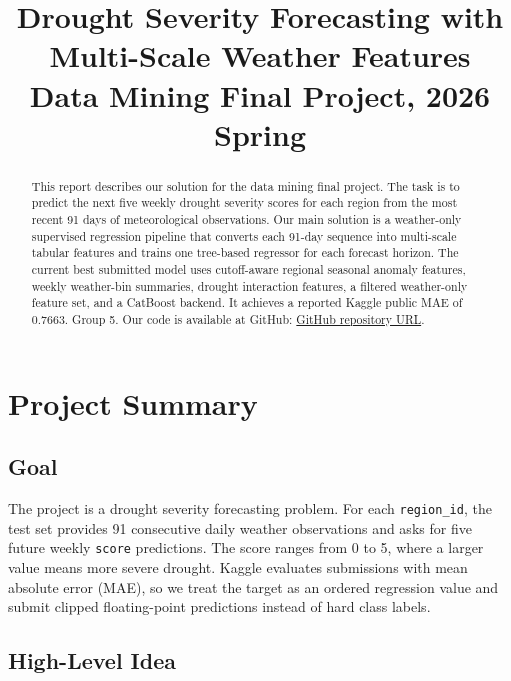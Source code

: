 \documentclass[conference]{IEEEtran}
\begin{document}
\title{Drought Severity Forecasting with Multi-Scale Weather Features\\
{\footnotesize Data Mining Final Project, 2026 Spring}
}

\author{
\and
{}
\and
{}
}

\maketitle

\begin{abstract}
This report describes our solution for the data mining final project. The task is
to predict the next five weekly drought severity scores for each region from the
most recent 91 days of meteorological observations. Our main solution is a
weather-only supervised regression pipeline that converts each 91-day sequence
into multi-scale tabular features and trains one tree-based regressor for each
forecast horizon. The current best submitted model uses cutoff-aware regional
seasonal anomaly features, weekly weather-bin summaries, drought interaction
features, a filtered weather-only feature set, and a CatBoost backend. It
achieves a reported Kaggle public MAE of 0.7663. Group 5. Our code is
available at GitHub:
\href{https://github.com/mikehsuhoodie/DataMining_Final_Project}{\color{blue}GitHub repository URL}.
\end{abstract}

\section{Project Summary}

\subsection{Goal}

The project is a drought severity forecasting problem. For each \texttt{region\_id},
the test set provides 91 consecutive daily weather observations and asks for
five future weekly \texttt{score} predictions. The score ranges from 0 to 5,
where a larger value means more severe drought. Kaggle evaluates submissions
with mean absolute error (MAE), so we treat the target as an ordered regression
value and submit clipped floating-point predictions instead of hard class labels.

\subsection{High-Level Idea}
\end{document}
